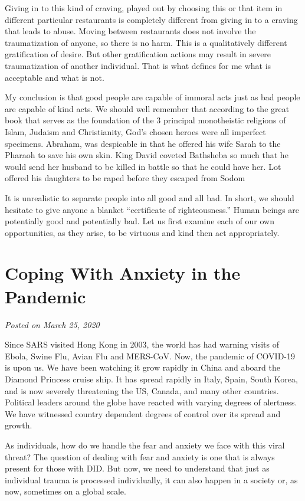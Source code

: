 \documentclass[]{book}
\begin{document}
Giving in to this kind of craving, played out by choosing this or that item in different particular restaurants is completely different from giving in to a craving that leads to abuse. Moving between restaurants does not involve the traumatization of anyone, so there is no harm. This is a qualitatively different gratification of desire. But other gratification actions may result in severe traumatization of another individual. That is what defines for me what is acceptable and what is not.

My conclusion is that good people are capable of immoral acts just as bad people are capable of kind acts. We should well remember that according to the great book that serves as the foundation of the 3 principal monotheistic religions of Islam, Judaism and Christianity, God's chosen heroes were all imperfect specimens. Abraham, was despicable in that he offered his wife Sarah to the Pharaoh to save his own skin. King David coveted Bathsheba so much that he would send her husband to be killed in battle so that he could have her. Lot offered his daughters to be raped before they escaped from Sodom

It is unrealistic to separate people into all good and all bad. In short, we should hesitate to give anyone a blanket ``certificate of righteousness.'' Human beings are potentially good and potentially bad. Let us first examine each of our own opportunities, as they arise, to be virtuous and kind then act appropriately.

\hypertarget{coping-with-anxiety-in-the-pandemic}{%
\section{Coping With Anxiety in the Pandemic}\label{coping-with-anxiety-in-the-pandemic}}

\emph{Posted on March 25, 2020}

Since SARS visited Hong Kong in 2003, the world has had warning visits of Ebola, Swine Flu, Avian Flu and MERS-CoV. Now, the pandemic of COVID-19 is upon us. We have been watching it grow rapidly in China and aboard the Diamond Princess cruise ship. It has spread rapidly in Italy, Spain, South Korea, and is now severely threatening the US, Canada, and many other countries. Political leaders around the globe have reacted with varying degrees of alertness. We have witnessed country dependent degrees of control over its spread and growth.

As individuals, how do we handle the fear and anxiety we face with this viral threat? The question of dealing with fear and anxiety is one that is always present for those with DID. But now, we need to understand that just as individual trauma is processed individually, it can also happen in a society or, as now, sometimes on a global scale.
\end{document}
